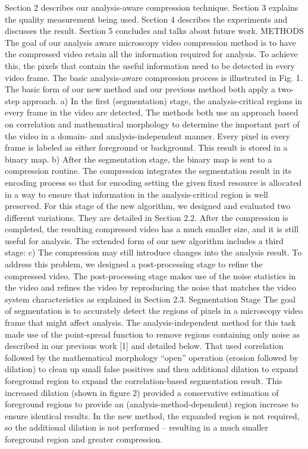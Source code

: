 Section 2 describes our analysis-aware compression technique. Section 3 explains the quality measurement being used. Section 4 describes the experiments and discusses the result.  Section 5 concludes and talks about future work.
METHODS
The goal of our analysis aware microscopy video compression method is to have the compressed video retain all the information required for analysis. To achieve this, the pixels that contain the useful information need to be detected in every video frame.
The basic analysis-aware compression process is illustrated in Fig. 1. The basic form of our new method and our previous method both apply a two-step approach. a) In the first (segmentation) stage, the analysis-critical regions in every frame in the video are detected. The methods both use an approach based on correlation and mathematical morphology to determine the important part of the video in a domain- and analysis-independent manner. Every pixel in every frame is labeled as either foreground or background. This result is stored in a binary map. b) After the segmentation stage, the binary map is sent to a compression routine. The compression integrates the segmentation result in its encoding process so that for encoding setting the given fixed resource is allocated in a way to ensure that information in the analysis-critical region is well preserved. For this stage of the new algorithm, we designed and evaluated two different variations. They are detailed in Section 2.2.  After the compression is completed, the resulting compressed video has a much smaller size, and it is still useful for analysis. The extended form of our new algorithm includes a third stage: c) The compression may still introduce changes into the analysis result. To address this problem, we designed a post-processing stage to refine the compressed video. The post-processing stage makes use of the noise statistics in the video and refines the video by reproducing the noise that matches the video system characteristics as explained in Section 2.3.
Segmentation Stage
The goal of segmentation is to accurately detect the regions of pixels in a microscopy video frame that might affect analysis.  The analysis-independent method for this task made use of the point-spread function to remove regions containing only noise as described in our previous work [1] and detailed below. That used correlation followed by the mathematical morphology “open” operation (erosion followed by dilation) to clean up small false positives and then additional dilation to expand foreground region to expand the correlation-based segmentation result. This increased dilation (shown in figure 2) provided a conservative estimation of foreground regions to provide an (analysis-method-dependent) region increase to ensure identical results.  In the new method, the expanded region is not required, so the additional dilation is not performed – resulting in a much smaller foreground region and greater compression.
